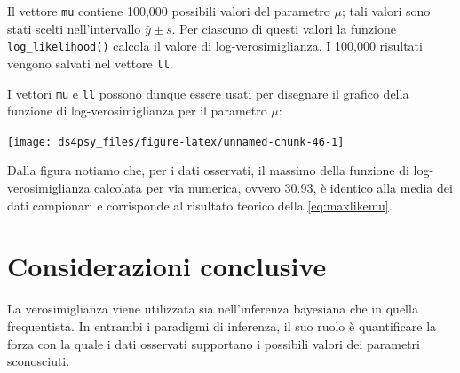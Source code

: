 \documentclass[
  11pt,
]{krantz}
\makeatletter
\newenvironment{Shaded}{\begin{snugshade}}{\end{snugshade}}
\newcommand{\AttributeTok}[1]{\textcolor[rgb]{0.61,0.61,0.61}{#1}}
\newcommand{\FunctionTok}[1]{\textcolor[rgb]{0,0,0}{#1}}
\newcommand{\NormalTok}[1]{#1}
\newcommand{\SpecialCharTok}[1]{\textcolor[rgb]{0,0,0}{#1}}
\newcommand{\StringTok}[1]{\textcolor[rgb]{0.5,0.5,0.5}{#1}}
\newenvironment{kframe}{%
\medskip{}
\setlength{\fboxsep}{.8em}
 \def\at@end@of@kframe{}%
 \ifinner\ifhmode%
  \def\at@end@of@kframe{\end{minipage}}%
  \begin{minipage}{\columnwidth}%
 \fi\fi%
 \def\FrameCommand##1{\hskip\@totalleftmargin \hskip-\fboxsep
 \colorbox{shadecolor}{##1}\hskip-\fboxsep
     \hskip-\linewidth \hskip-\@totalleftmargin \hskip\columnwidth}%
 \MakeFramed {\advance\hsize-\width
   \@totalleftmargin\z@ \linewidth\hsize
   \@setminipage}}%
 {\par\unskip\endMakeFramed%
 \at@end@of@kframe}
\renewenvironment{Shaded}{\begin{kframe}}{\end{kframe}}
\theoremstyle{definition}
\theoremstyle{definition}
\theoremstyle{definition}
\theoremstyle{definition}
\theoremstyle{remark}
\makeatother
\begin{document}
Il vettore \texttt{mu} contiene 100,000 possibili valori del parametro \(\mu\); tali valori sono stati scelti nell'intervallo \(\bar{y} \pm s\). Per ciascuno di questi valori la funzione \texttt{log\_likelihood()} calcola il valore di log-verosimiglianza. I 100,000 risultati vengono salvati nel vettore \texttt{ll}.

I vettori \texttt{mu} e \texttt{ll} possono dunque essere usati per disegnare il grafico della funzione di log-verosimiglianza per il parametro \(\mu\):

\begin{Shaded}
\end{Shaded}

\begin{center}\texttt{[image: ds4psy\_files/figure-latex/unnamed-chunk-46-1]} \end{center}

Dalla figura notiamo che, per i dati osservati, il massimo della funzione di log-verosimiglianza calcolata per via numerica, ovvero 30.93, è identico alla media dei dati campionari e corrisponde al risultato teorico della \eqref{eq:maxlikemu}.

\hypertarget{considerazioni-conclusive}{%
\section*{Considerazioni conclusive}\label{considerazioni-conclusive}}


La verosimiglianza viene utilizzata sia nell'inferenza bayesiana che in quella frequentista. In entrambi i paradigmi di inferenza, il suo ruolo è quantificare la forza con la quale i dati osservati supportano i possibili valori dei parametri sconosciuti.
\end{document}

